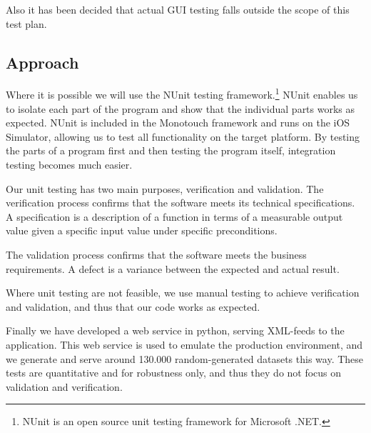 Also it has been decided that actual GUI testing falls outside the scope of 
this test plan. 

\subsection{Approach}
Where it is possible we will use the NUnit testing framework.\footnote{NUnit is
an open source unit testing framework for Microsoft .NET.} NUnit enables us to isolate each
part of the program and show that the individual parts works as expected. NUnit is included
in the Monotouch framework and runs on the iOS Simulator, allowing us to test all functionality
on the target platform. By testing the parts of a program first and then testing the program itself,
integration testing becomes much easier.

Our unit testing has two main purposes, verification and validation. The verification process confirms
that the software meets its technical specifications. A specification is a description of a function
in terms of a measurable output value given a specific input value under specific preconditions.

The validation process confirms that the software meets the business requirements. A defect is a
variance between the expected and actual result.

Where unit testing are not feasible, we use manual testing to achieve verification and validation,
and thus that our code works as expected.

Finally we have developed a web service in python, serving XML-feeds to the application. 
This web service is used to emulate the production environment, and we generate and serve 
around 130.000 random-generated datasets this way. 
These tests are quantitative and for robustness only, and thus they do not focus on 
validation and verification.

